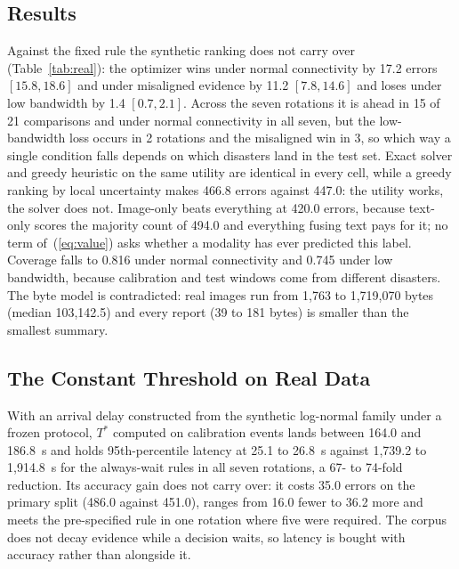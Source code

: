 \subsection{Results}
\label{sec:realresults}
Against the fixed rule the synthetic ranking does not carry over (Table~\ref{tab:real}): the optimizer wins under normal connectivity by 17.2 errors $[15.8, 18.6]$ and under misaligned evidence by 11.2 $[7.8, 14.6]$ and loses under low bandwidth by 1.4 $[0.7, 2.1]$. Across the seven rotations it is ahead in 15 of 21 comparisons and under normal connectivity in all seven, but the low-bandwidth loss occurs in 2 rotations and the misaligned win in 3, so which way a single condition falls depends on which disasters land in the test set. Exact solver and greedy heuristic on the same utility are identical in every cell, while a greedy ranking by local uncertainty makes 466.8 errors against 447.0: the utility works, the solver does not. Image-only beats everything at 420.0 errors, because text-only scores the majority count of 494.0 and everything fusing text pays for it; no term of~(\ref{eq:value}) asks whether a modality has ever predicted this label. Coverage falls to 0.816 under normal connectivity and 0.745 under low bandwidth, because calibration and test windows come from different disasters. The byte model is contradicted: real images run from 1,763 to 1,719,070 bytes (median 103,142.5) and every report (39 to 181 bytes) is smaller than the smallest summary.

\subsection{The Constant Threshold on Real Data}
\label{sec:realthreshold}
With an arrival delay constructed from the synthetic log-normal family under a frozen protocol, $T^\ast$ computed on calibration events lands between 164.0 and 186.8~s and holds 95th-percentile latency at 25.1 to 26.8~s against 1,739.2 to 1,914.8~s for the always-wait rules in all seven rotations, a 67- to 74-fold reduction. Its accuracy gain does not carry over: it costs 35.0 errors on the primary split (486.0 against 451.0), ranges from 16.0 fewer to 36.2 more and meets the pre-specified rule in one rotation where five were required. The corpus does not decay evidence while a decision waits, so latency is bought with accuracy rather than alongside it.

